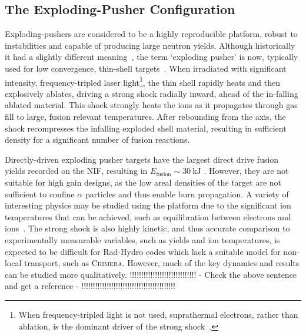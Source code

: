 \subsection{The Exploding-Pusher Configuration}%
\label{sec:Res2_expl}

Exploding-pushers are considered to be a highly reproducible platform, robust to instabilities and capable of producing large neutron yields.
Although historically it had a slightly different meaning~\cite{craxton_direct-drive_2015}, the term `exploding pusher' is now, typically used for low convergence, thin-shell targets~\cite{ellison_development_2018}.
When irradiated with significant intensity, frequency-tripled laser light\footnote{When frequency-tripled light is not used, suprathermal electrons, rather than ablation, is the dominant driver of the strong shock~\cite{yeamans_high_2021}.}, the thin shell rapidly heats and then explosively ablates, driving a strong shock radially inward, ahead of the in-falling ablated material.
This shock strongly heats the ions as it propagates through gas fill to large, fusion relevant temperatures.
After rebounding from the axis, the shock recompresses the infalling exploded shell material, resulting in sufficient density for a significant number of fusion reactions.

Directly-driven exploding pusher targets have the largest direct drive fusion yields recorded on the \ac{NIF}, resulting in $E_{\text{fusion}}\sim 30\ \text{kJ}$ \cite{yeamans_high_2021}.
However, they are not suitable for high gain designs, as the low areal densities of the target are not sufficient to confine $\alpha$ particles and thus enable burn propagation.
A variety of interesting physics may be studied using the platform due to the significant ion temperatures that can be achieved, such as equilibration between electrons and ions~\cite{benedict_molecular_2012}.
The strong shock is also highly kinetic, and thus accurate comparison to experimentally measurable variables, such as yields and ion temperatures, is expected to be difficult for \ac{Rad-Hydro} codes which lack a suitable model for non-local transport, such as \textsc{Chimera}.
However, much of the key dynamics and results can be studied more qualitatively.
!!!!!!!!!!!!!!!!!!!!!!!!!!!!! - Check the above sentence and get a reference - !!!!!!!!!!!!!!!!!!!!!!!!!!!!!!!!!!!!!!!!!

